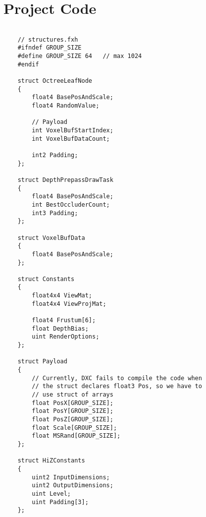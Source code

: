 \clearpage

\section*{Project Code}


\begin{lstlisting}

    // structures.fxh
    #ifndef GROUP_SIZE
    #define GROUP_SIZE 64   // max 1024
    #endif
    
    struct OctreeLeafNode
    {
        float4 BasePosAndScale;
        float4 RandomValue;
        
        // Payload
        int VoxelBufStartIndex;
        int VoxelBufDataCount;
        
        int2 Padding;
    };
    
    struct DepthPrepassDrawTask
    {
        float4 BasePosAndScale;
        int BestOccluderCount;
        int3 Padding;
    };
    
    struct VoxelBufData
    {
        float4 BasePosAndScale;
    };
    
    struct Constants
    {
        float4x4 ViewMat;
        float4x4 ViewProjMat;
        
        float4 Frustum[6];
        float DepthBias;
        uint RenderOptions;
    };
    
    struct Payload
    {
        // Currently, DXC fails to compile the code when
        // the struct declares float3 Pos, so we have to
        // use struct of arrays
        float PosX[GROUP_SIZE];
        float PosY[GROUP_SIZE];
        float PosZ[GROUP_SIZE];
        float Scale[GROUP_SIZE];
        float MSRand[GROUP_SIZE];
    };
    
    struct HiZConstants
    {
        uint2 InputDimensions;
        uint2 OutputDimensions;
        uint Level;
        uint Padding[3];
    };

\end{lstlisting}

